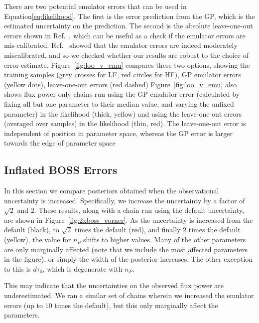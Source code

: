 \documentclass[a4paper,11pt]{article}
\begin{document}
There are two potential emulator errors that can be used in Equation\ref{eq:likelihood}.
The first is the error prediction from the GP, which is the estimated uncertainty on the prediction.
The second is the absolute leave-one-out errors shown in Ref.~\cite{2023simsuite}, which can be useful as a check if the emulator errors are mis-calibrated. Ref.~\cite{2023simsuite} showed that the emulator errors are indeed moderately miscalibrated, and so we checked whether our results are robust to the choice of error estimate.
Figure~\ref{fig:loo_v_emu} compares these two options, showing the training samples (grey crosses for LF, red circles for HF), GP emulator errors (yellow dots), leave-one-out errors (red dashed)
Figure~\ref{fig:loo_v_emu} also shows flux power only chains run using the GP emulator error (calculated by fixing all but one parameter to their median value, and varying the unfixed parameter) in the likelihood (thick, yellow) and using the leave-one-out errors (averaged over samples) in the likelihood (thin, red). The leave-one-out error is independent of position in parameter space, whereas the GP error is larger towards the edge of parameter space

\subsection{Inflated BOSS Errors}\label{sec:xboss}

In this section we compare posteriors obtained when the observational uncertainty is increased.
Specifically, we increase the uncertainty by a factor of $\sqrt{2}$ and $2$.
These results, along with a chain run using the default uncertainty, are shown in Figure~\ref{fig:2xboss_corner}.
As the uncertainty is increased from the default (black), to $\sqrt{2}$ times the default (red), and finally $2$ times the default (yellow), the value for $n_P$ shifts to higher values.
Many of the other parameters are only marginally affected (note that we include the most affected parameters in the figure), or simply the width of the posterior increases.
The other exception to this is $d\tau_0$, which is degenerate with $n_P$.

This may indicate that the uncertainties on the observed flux power are underestimated.
We ran a similar set of chains wherein we increased the emulator errors (up to $10$ times the default), but this only marginally affect the parameters.
\end{document}
